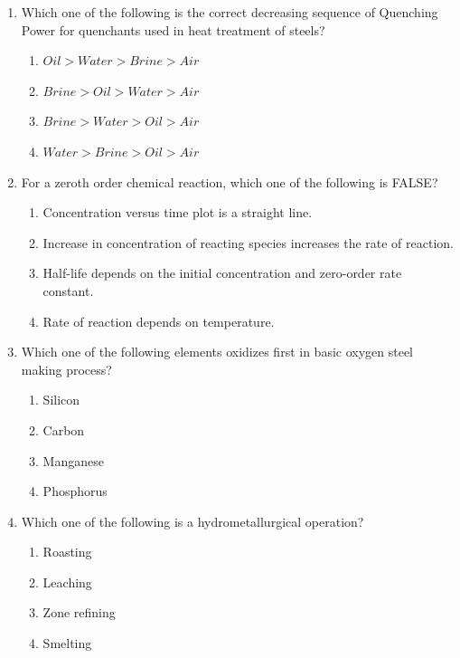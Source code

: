 \documentclass[journal]{IEEEtran}
\theoremstyle{remark}
\begin{document}
\begin{enumerate}
\item Which one of the following is the correct decreasing sequence of Quenching Power for quenchants used in heat treatment of steels? \hfill{}
\begin{multicols}{2}
\begin{enumerate}
\item $Oil>Water>Brine>Air$
\item $Brine>Oil>Water>Air$
\item $Brine>Water>Oil>Air$
\item $Water>Brine>Oil>Air$
\end{enumerate}
\end{multicols}

\item For a zeroth order chemical reaction, which one of the following is FALSE? \hfill{}
\begin{enumerate}
\item Concentration versus time plot is a straight line.
\item Increase in concentration of reacting species increases the rate of reaction.
\item Half-life depends on the initial concentration and zero-order rate constant.
\item Rate of reaction depends on temperature.
\end{enumerate}

\item Which one of the following elements oxidizes first in basic oxygen steel making process? \hfill{}
\begin{multicols}{4}
\begin{enumerate}
\item Silicon
\item Carbon
\item Manganese
\item Phosphorus
\end{enumerate}
\end{multicols}

\item Which one of the following is a hydrometallurgical operation? \hfill{}
\begin{multicols}{4}
\begin{enumerate}
\item Roasting
\item Leaching
\item Zone refining
\item Smelting
\end{enumerate}
\end{multicols}

\end{enumerate}
\end{document}
